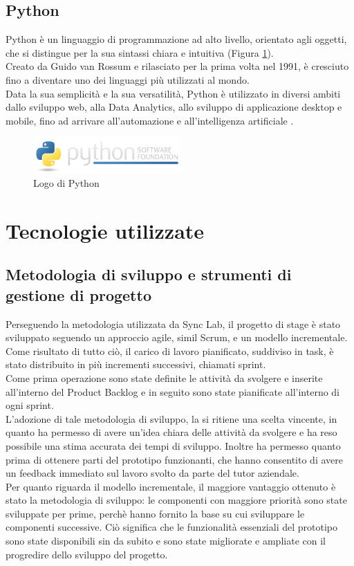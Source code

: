 \subsection{Python}
Python è un linguaggio di programmazione ad alto livello, orientato agli oggetti,
che si distingue per la sua sintassi chiara e intuitiva (Figura \ref{fig:python}).\\
Creato da Guido van Rossum e rilasciato per la prima volta nel 1991, è cresciuto fino a 
diventare uno dei linguaggi più utilizzati al mondo.\\
Data la sua semplicità e la sua versatilità, Python è utilizzato in diversi ambiti dallo sviluppo web, alla \gls{Data Analytics}{}, allo sviluppo di applicazione 
desktop e mobile, fino ad arrivare all'automazione e all'intelligenza artificiale \cite{site:Doc_Python}.
\begin{figure}[hpp]
    \centering
    \includegraphics[width=0.5\textwidth]{images/tecnologie/logo_python.png}
    \caption{Logo di Python}
    \label{fig:python}
\end{figure}
\section{Tecnologie utilizzate}
\subsection{Metodologia di sviluppo e strumenti di gestione di progetto}
Perseguendo la metodologia utilizzata da Sync Lab, il progetto di stage è stato sviluppato seguendo un
approccio \gls{agile}{}, simil \gls{Scrum}{}, e un \gls{modello incrementale}{}.\\ 
Come risultato di tutto ciò, il carico di lavoro pianificato, suddiviso in task, è stato distribuito in più incrementi successivi, 
chiamati \gls{sprint}{}.\\
Come prima operazione sono state definite le attività da svolgere e inserite all'interno del \gls{Product Backlog}{} e in seguito 
sono state pianificate all'interno di ogni \gls{sprint}{}.\\
L'adozione di tale metodologia di sviluppo, la si ritiene una scelta vincente, in quanto ha permesso di avere un'idea chiara
delle attività da svolgere e ha reso possibile una stima accurata dei tempi di sviluppo. Inoltre ha permesso quanto prima di ottenere 
parti del prototipo funzionanti, che hanno consentito di avere un feedback immediato sul lavoro svolto da parte del tutor aziendale.\\
Per quanto riguarda il \gls{modello incrementale}{}, il maggiore vantaggio ottenuto è stato la metodologia di sviluppo: le componenti 
con maggiore priorità sono state sviluppate per prime, perchè hanno fornito la base su cui sviluppare le componenti successive. Ciò significa che 
le funzionalità essenziali del prototipo sono state disponibili sin da subito e sono state migliorate e ampliate con il progredire dello sviluppo del progetto.
